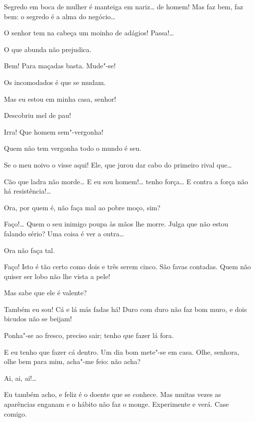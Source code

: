 \begin{linenumbers}
  Segredo em boca de mulher é manteiga em nariz\ldots{}  de homem! Mas faz bem, faz bem: o segredo é a alma do
negócio\ldots{}

  O senhor tem na cabeça um moinho de adágios! Passa!\ldots{}

  O que abunda não prejudica.

  Bem! Para maçadas basta. Mude"-se!

  Os incomodados é que se mudam.

  Mas eu estou em minha casa, senhor!

  Descobriu mel de pau!

  Irra! Que homem sem"-vergonha!

   Quem não tem vergonha
todo o mundo é seu.

  Se o meu noivo o visse aqui! Ele, que jurou dar cabo do primeiro
rival que\ldots{}

  Cão que ladra não morde\ldots{} E eu sou homem!\ldots{} tenho
força\ldots{} E contra a força não há resistência!\ldots{}

   Ora, por quem é, não faça mal ao pobre moço, sim?

  Faço!\ldots{} Quem o seu inimigo poupa às mãos lhe morre.  Julga
que não estou falando sério? Uma coisa é ver a outra\ldots{}

   Ora não faça tal.

  Faço! Isto é tão certo como dois e três serem cinco. São favas
contadas.
Quem não quiser ser lobo não lhe vista a pele!

  Mas sabe que ele é valente?

  Também eu sou! Cá e lá más fadas há! Duro com duro não faz bom
muro, e dois bicudos não se beijam!

  Ponha"-se ao fresco, preciso sair; tenho que fazer lá fora.

  E eu tenho que fazer cá dentro. Um dia bom mete"-se em casa.
 Olhe, senhora, olhe bem para mim, acha"-me feio: não acha?

  Ai, ai, ai!\ldots{}

  Eu também acho, e feliz é o doente que se conhece. Mas muitas
vezes as aparências enganam e o hábito não faz o monge. Experimente e verá.
 Case comigo.


\end{linenumbers}
